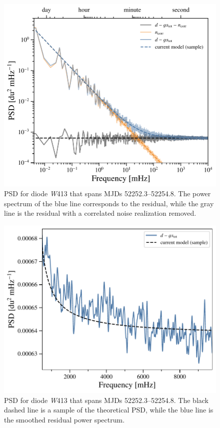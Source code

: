 \documentclass[twocolumn]{../../common/aa}
\newcommand{\W}[0]{\textit W}
\begin{document}
\begin{figure}
	\includegraphics[width=\columnwidth]{figures/ps_test_W4_det1.pdf}
	\caption{PSD for diode \W413 that spans MJDs 52252.3--52254.8. The power spectrum of the blue line corresponds to the residual, while the gray line is the residual with a correlated noise realization removed.}
	\label{fig:W413_psd}
\end{figure}

\begin{figure}
	\includegraphics[width=\columnwidth]{figures/ps_test_W4_det1_zoom.pdf}
	\caption{PSD for diode \W413 that spans MJDs 52252.3--52254.8. 
	The black dashed line is a sample of the theoretical PSD, while the blue line is the smoothed residual power spectrum.
	}
	\label{fig:W413_psd_zoom}
\end{figure}
\end{document}
